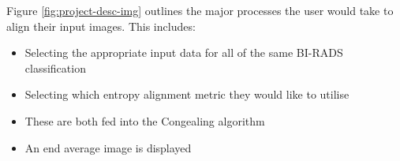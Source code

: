 Figure \ref{fig:project-desc-img} outlines the major processes the user would take to align their input images. This includes:

\begin{itemize}
  \item Selecting the appropriate input data for all of  the same BI-RADS classification
  \item Selecting which entropy alignment metric they would like to utilise
  \item These are both fed into the \Gls{Congealing} algorithm
  \item An end average image is displayed
\end{itemize}
